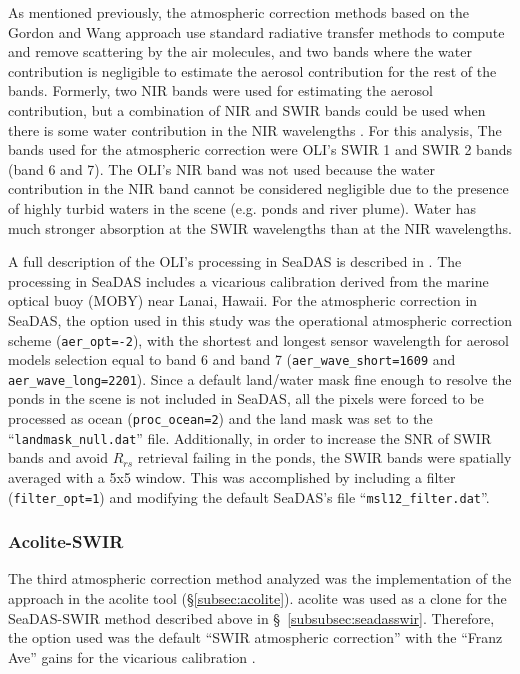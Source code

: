 As mentioned previously, the atmospheric correction methods based on the Gordon and Wang approach use standard radiative transfer methods to compute and remove scattering by the air molecules, and two bands where the water contribution is negligible to estimate the aerosol contribution for the rest of the bands. Formerly, two NIR bands were used for estimating the aerosol contribution, but a combination of NIR and SWIR bands could be used when there is some water contribution in the NIR wavelengths \cite{Wang2009}. For this analysis, The bands used for the atmospheric correction were OLI's SWIR 1 and SWIR 2 bands (band 6 and 7). The OLI's NIR band was not used because the water contribution in the NIR band cannot be considered negligible due to the presence of highly turbid waters in the scene (e.g. ponds and river plume). Water has much stronger absorption at the SWIR wavelengths than at the NIR wavelengths. 

A full description of the OLI's processing in SeaDAS is described in \cite{Franz:2015}. The processing in SeaDAS includes a vicarious calibration derived from the marine optical buoy (MOBY) near Lanai, Hawaii. For the atmospheric correction in SeaDAS, the option used in this study was the operational atmospheric correction scheme ({\tt aer\_opt=-2}), with the shortest and longest sensor wavelength for aerosol models selection equal to band 6 and band 7 ({\tt aer\_wave\_short=1609} and {\tt aer\_wave\_long=2201}). Since a default land/water mask fine enough to resolve the ponds in the scene is not included in SeaDAS, all the pixels were forced to be processed as ocean ({\tt proc\_ocean=2}) and the land mask was set to the ``{\tt landmask\_null.dat}'' file. Additionally, in order to increase the SNR of SWIR bands and avoid $R_{rs}$ retrieval failing in the ponds, the SWIR bands were spatially averaged with a 5x5 window. This was accomplished by including a filter ({\tt filter\_opt=1}) and modifying the default SeaDAS's file ``{\tt msl12\_filter.dat}''.
\subsubsection{Acolite-SWIR}
The third atmospheric correction method analyzed was the implementation of the \cite{Gordon:1994} approach in the \gls{acolite} tool (\S\ref{subsec:acolite}). \gls{acolite} was used as a clone for the SeaDAS-SWIR method described above in \S~\ref{subsubsec:seadasswir}. Therefore, the option used was the default ``SWIR atmospheric correction'' with the ``Franz Ave'' gains for the vicarious calibration \cite{Franz:2015}.
